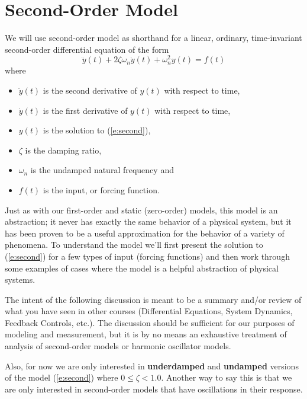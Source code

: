 \section{Second-Order Model}
We will use \gls{second-order model} as shorthand for a linear, ordinary, time-invariant second-order differential equation of the form
\begin{equation} \label{e:second}
\ddot{y}(t) + 2 \zeta \omega_n \dot{y}(t) + \omega_n^2 y(t) = f(t)
\end{equation} 
where 
\begin{itemize}
\item $\ddot{y}(t)$ is the second derivative of $y(t)$ with respect to time,
\item $\dot{y}(t)$ is the first derivative of $y(t)$ with respect to time,
\item $y(t)$ is the solution to (\ref{e:second}),
\item $\zeta$ is the \gls{damping ratio},
\item $\omega_n$ is the \gls{undamped natural frequency} and
\item $f(t)$ is the input, or forcing function.
\end{itemize}
Just as with our first-order and static (zero-order) models, this model is an abstraction; it never has exactly the same behavior of a physical system, but it has been proven to be a useful approximation for the behavior of a variety of phenomena.  To understand the model we'll first present the solution to (\ref{e:second}) for a few types of input (forcing functions) and then work through some examples of cases where the model is a helpful abstraction of physical systems.

The intent of the following discussion is meant to be a summary and/or review of what you have seen in other courses (Differential Equations, System Dynamics, Feedback Controls, etc.).  The discussion should be sufficient for our purposes of modeling and measurement, but it is by no means an exhaustive treatment of analysis of second-order models or harmonic oscillator models.

Also, for now we are only interested in {\bf underdamped} and {\bf undamped} versions of the model (\ref{e:second}) where $0 \leq \zeta < 1.0$.  Another way to say this is that we are only interested in second-order models that have oscillations in their response.

